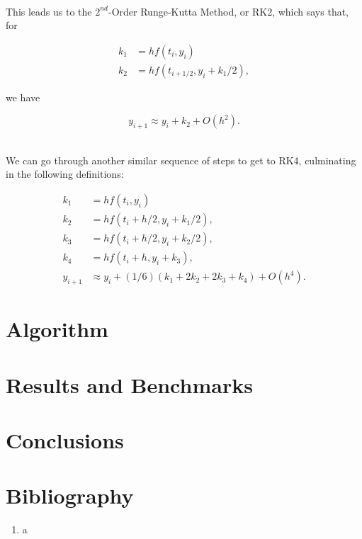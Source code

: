 \documentclass[12pt]{article}
\numberwithin{equation}{section}
\begin{document}
\\\indent This leads us to the $2^{nd}$-Order Runge-Kutta Method, or RK2, which says that, for

\begin{equation}
\label{eq:rk2part1}
\begin{align}
k_{1} & = hf\left(t_{i},y_{i}\right) \\
k_{2} & = hf\left(t_{i+1/2},y_{i}+k_{1}/2\right),
\end{align}
\end{equation}

\noindent we have

\begin{equation}
\label{eq:re2part2}
y_{i+1} \approx y_{i}+k_{2}+O\left(h^{2}\right).
\end{equation}

\\\indent We can go through another similar sequence of steps to get to RK4, culminating in the following definitions:

\begin{equation}
\label{eq:rk4}
\begin{align}
k_{1} & = hf\left(t_{i},y_{i}\right) \\
k_{2} & = hf\left(t_{i}+h/2,y_{i}+k_{1}/2\right), \\
k_{3} & = hf\left(t_{i}+h/2,y_{i}+k_{2}/2\right), \\
k_{4} & = hf\left(t_{i}+h,y_{i}+k_{3}\right), \\
y_{i+1} & \approx y_{i}+\left(1/6\right)\left(k_{1}+2k_{2}+2k_{3}+k_{4}\right)+O\left(h^{4}\right).
\end{align}
\end{equation}

\section{Algorithm}
\label{sec:algorithm}

\section{Results and Benchmarks}
\label{sec:results}



\section{Conclusions}
\label{sec:conclusions}



\section{Bibliography}
\label{sec:bib}

\begin{enumerate}

\item a

\end{enumerate}
\end{document}
